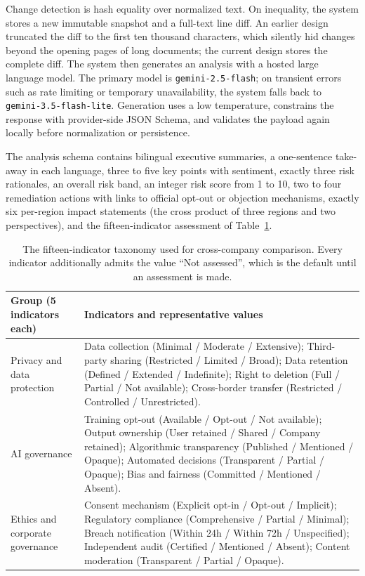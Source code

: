 \documentclass[11pt]{article}
\begin{document}
Change detection is hash equality over normalized text. On inequality, the system
stores a new immutable snapshot and a full-text line diff. An earlier design
truncated the diff to the first ten thousand characters, which silently hid
changes beyond the opening pages of long documents; the current design stores the
complete diff. The system then generates an analysis with a hosted large language
model. The primary model is \texttt{gemini-2.5-flash}; on transient errors such
as rate limiting or temporary unavailability, the system falls back to
\texttt{gemini-3.5-flash-lite}. Generation uses a low temperature, constrains
the response with provider-side JSON Schema, and validates the payload again
locally before normalization or persistence.

The analysis schema contains bilingual executive summaries, a one-sentence
take-away in each language, three to five key points with sentiment, exactly
three risk rationales, an overall risk band, an integer risk score from 1 to 10,
two to four remediation actions with links to official opt-out or objection
mechanisms, exactly six per-region impact statements (the cross product of three
regions and two perspectives), and the fifteen-indicator assessment of
Table~\ref{tab:kpi}.

\begin{table}[htbp]
\centering
\small
\begin{tabularx}{\textwidth}{@{}l X@{}}
\toprule
\textbf{Group (5 indicators each)} & \textbf{Indicators and representative values} \\
\midrule
Privacy and data protection &
Data collection (Minimal / Moderate / Extensive); Third-party sharing
(Restricted / Limited / Broad); Data retention (Defined / Extended /
Indefinite); Right to deletion (Full / Partial / Not available); Cross-border
transfer (Restricted / Controlled / Unrestricted). \\
\addlinespace
AI governance &
Training opt-out (Available / Opt-out / Not available); Output ownership
(User retained / Shared / Company retained); Algorithmic transparency
(Published / Mentioned / Opaque); Automated decisions (Transparent / Partial /
Opaque); Bias and fairness (Committed / Mentioned / Absent). \\
\addlinespace
Ethics and corporate governance &
Consent mechanism (Explicit opt-in / Opt-out / Implicit); Regulatory compliance
(Comprehensive / Partial / Minimal); Breach notification (Within 24h / Within
72h / Unspecified); Independent audit (Certified / Mentioned / Absent); Content
moderation (Transparent / Partial / Opaque). \\
\bottomrule
\end{tabularx}
\caption{The fifteen-indicator taxonomy used for cross-company comparison. Every
indicator additionally admits the value ``Not assessed'', which is the default
until an assessment is made.}
\label{tab:kpi}
\end{table}
\FloatBarrier
\end{document}
